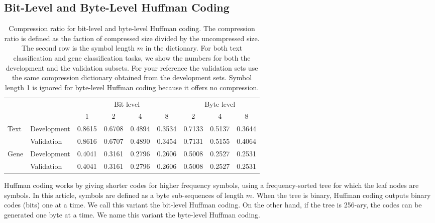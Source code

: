 \documentclass{article}
\begin{document}
\subsection{Bit-Level and Byte-Level Huffman Coding}

\begin{table}[h]
  \caption{Compression ratio for bit-level and byte-level Huffman coding. The compression ratio is defined as the faction of compressed size divided by the uncompressed size. The second row is the symbol length $m$ in the dictionary. For both text classification and gene classification tasks, we show the numbers for both the development and the validation subsets. For your reference the validation sets use the same compression dictionary obtained from the development sets. Symbol length 1 is ignored for byte-level Huffman coding because it offers no compression.}
  \label{tab:compression}
  \begin{center}
    \begin{tabular}{ll|rrrr|rrr}
      \hline
      & & \multicolumn{4}{c}{Bit level} & \multicolumn{3}{|c}{Byte level} \\
      & & \multicolumn{1}{c}{1} & \multicolumn{1}{c}{2} & \multicolumn{1}{c}{4} & \multicolumn{1}{c}{8} & \multicolumn{1}{|c}{2} & \multicolumn{1}{c}{4} & \multicolumn{1}{c}{8} \\ \hline
      \multirow{2}{*}{Text} & Development & 0.8615 & 0.6708 & 0.4894 & 0.3534 & 0.7133 & 0.5137 & 0.3644 \\
      & Validation & 0.8616 & 0.6707 & 0.4890 & 0.3454 & 0.7131 & 0.5155 & 0.4064 \\ \hline
      \multirow{2}{*}{Gene}  & Development & 0.4041 & 0.3161 & 0.2796 & 0.2606 & 0.5008 & 0.2527 & 0.2531 \\
      & Validation & 0.4041 & 0.3161 & 0.2796 & 0.2606 & 0.5008 & 0.2527 & 0.2531 \\
    \hline
    \end{tabular}
  \end{center}
\end{table}

Huffman coding \cite{H52} works by giving shorter codes for higher frequency symbols, using a frequency-sorted tree for which the leaf nodes are symbols. In this article, symbols are defined as a byte sub-sequences of length \(m\). When the tree is binary, Huffman coding outputs binary codes (bits) one at a time. We call this variant the bit-level Huffman coding. On the other hand, if the tree is 256-ary, the codes can be generated one byte at a time. We name this variant the byte-level Huffman coding.
\end{document}
